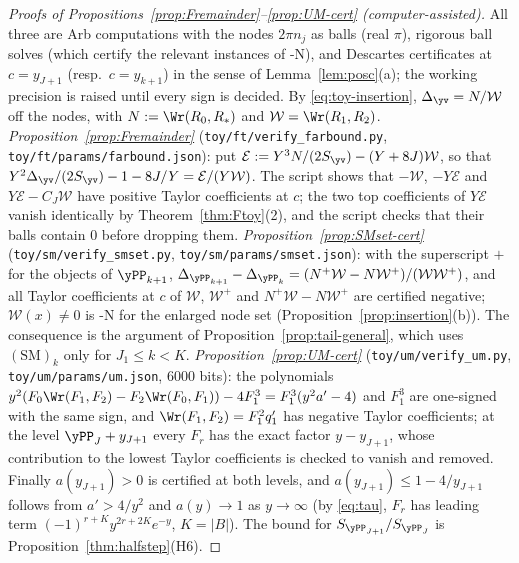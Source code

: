 \begin{proof}[Proofs of Propositions~\ref{prop:Fremainder}--\ref{prop:UM-cert} \textup{(computer-assisted)}]
All three are Arb computations with the nodes $2\pi n_j$ as balls (real $\pi$), rigorous ball solves (which certify the
relevant instances of \hyp{N}), and Descartes certificates at $c=y_{J+1}$ (resp.\ $c=y_{k+1}$) in the sense of
Lemma~\ref{lem:posc}(a); the working precision is raised until every sign is decided. By \eqref{eq:toy-insertion},
$\Delta_{\yv}=N/\mathcal W$ off the nodes, with $N:=\Wr(R_0,R_*)$ and $\mathcal W=\Wr(R_1,R_2)$.
\emph{Proposition~\ref{prop:Fremainder}} (\nolinkurl{toy/ft/verify_farbound.py}, \nolinkurl{toy/ft/params/farbound.json}):
put $\mathcal E:=Y^3N/(2S_{\yv})-(Y+8J)\mathcal W$, so that $Y^2\Delta_{\yv}/(2S_{\yv})-1-8J/Y=\mathcal E/(Y\mathcal W)$. The
script shows that $-\mathcal W$, $-Y\mathcal E$ and $Y\mathcal E-C_J\mathcal W$ have positive Taylor coefficients at $c$; the two top coefficients of
$Y\mathcal E$ vanish identically by Theorem~\ref{thm:Ftoy}(2), and the script checks that their balls contain $0$ before
dropping them.
\emph{Proposition~\ref{prop:SMset-cert}} (\nolinkurl{toy/sm/verify_smset.py}, \nolinkurl{toy/sm/params/smset.json}): with the
superscript $+$ for the objects of $\yPP_{k+1}$,
$\Delta_{\yPP_{k+1}}-\Delta_{\yPP_k}=(N^+\mathcal W-N\mathcal W^+)/(\mathcal W\mathcal W^+)$, and all Taylor coefficients at $c$
of $\mathcal W$, $\mathcal W^+$ and $N^+\mathcal W-N\mathcal W^+$ are certified negative; $\mathcal W(x)\ne0$ is \hyp{N} for the
enlarged node set (Proposition~\ref{prop:insertion}(b)). The consequence is the argument of Proposition~\ref{prop:tail-general}, which uses $(\mathrm{SM})_k$
only for $J_1\le k<K$.
\emph{Proposition~\ref{prop:UM-cert}} (\nolinkurl{toy/um/verify_um.py}, \nolinkurl{toy/um/params/um.json}, $6000$ bits): the
polynomials $y^2(F_0\Wr(F_1,F_2)-F_2\Wr(F_0,F_1))-4F_1^3=F_1^3(y^2a'-4)$ and $F_1^3$ are one-signed with the same sign, and
$\Wr(F_1,F_2)=F_1^2q_1'$ has negative Taylor coefficients; at the level $\yPP_J+y_{J+1}$ every $F_r$ has the exact factor
$y-y_{J+1}$, whose contribution to the lowest Taylor coefficients is checked to vanish and removed. Finally $a(y_{J+1})>0$
is certified at both levels, and $a(y_{J+1})\le1-4/y_{J+1}$ follows from $a'>4/y^2$ and $a(y)\to1$ as $y\to\infty$ (by
\eqref{eq:tau}, $F_r$ has leading term $(-1)^{r+K}y^{2r+2K}e^{-y}$, $K=|B|$). The bound for $S_{\yPP_{J+1}}/S_{\yPP_J}$ is Proposition~\ref{thm:halfstep}\textup{(H6)}.
\end{proof}

